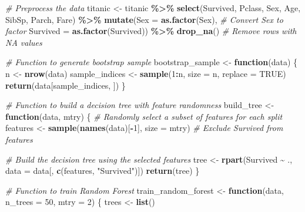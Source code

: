 \documentclass[
]{article}
\newenvironment{Shaded}{\begin{snugshade}}{\end{snugshade}}
\newcommand{\AttributeTok}[1]{\textcolor[rgb]{0.13,0.29,0.53}{#1}}
\newcommand{\CommentTok}[1]{\textcolor[rgb]{0.56,0.35,0.01}{\textit{#1}}}
\newcommand{\ConstantTok}[1]{\textcolor[rgb]{0.56,0.35,0.01}{#1}}
\newcommand{\ControlFlowTok}[1]{\textcolor[rgb]{0.13,0.29,0.53}{\textbf{#1}}}
\newcommand{\DecValTok}[1]{\textcolor[rgb]{0.00,0.00,0.81}{#1}}
\newcommand{\FunctionTok}[1]{\textcolor[rgb]{0.13,0.29,0.53}{\textbf{#1}}}
\newcommand{\NormalTok}[1]{#1}
\newcommand{\OtherTok}[1]{\textcolor[rgb]{0.56,0.35,0.01}{#1}}
\newcommand{\SpecialCharTok}[1]{\textcolor[rgb]{0.81,0.36,0.00}{\textbf{#1}}}
\newcommand{\StringTok}[1]{\textcolor[rgb]{0.31,0.60,0.02}{#1}}
\begin{document}
\begin{Shaded}
\begin{Highlighting}[]
\CommentTok{\# Preprocess the data}
\NormalTok{titanic }\OtherTok{\textless{}{-}}\NormalTok{ titanic }\SpecialCharTok{\%\textgreater{}\%}
  \FunctionTok{select}\NormalTok{(Survived, Pclass, Sex, Age, SibSp, Parch, Fare) }\SpecialCharTok{\%\textgreater{}\%}
  \FunctionTok{mutate}\NormalTok{(}\AttributeTok{Sex =} \FunctionTok{as.factor}\NormalTok{(Sex),  }\CommentTok{\# Convert Sex to factor}
         \AttributeTok{Survived =} \FunctionTok{as.factor}\NormalTok{(Survived)) }\SpecialCharTok{\%\textgreater{}\%}
  \FunctionTok{drop\_na}\NormalTok{()  }\CommentTok{\# Remove rows with NA values}

\CommentTok{\# Function to generate bootstrap sample}
\NormalTok{bootstrap\_sample }\OtherTok{\textless{}{-}} \ControlFlowTok{function}\NormalTok{(data) \{}
\NormalTok{  n }\OtherTok{\textless{}{-}} \FunctionTok{nrow}\NormalTok{(data)}
\NormalTok{  sample\_indices }\OtherTok{\textless{}{-}} \FunctionTok{sample}\NormalTok{(}\DecValTok{1}\SpecialCharTok{:}\NormalTok{n, }\AttributeTok{size =}\NormalTok{ n, }\AttributeTok{replace =} \ConstantTok{TRUE}\NormalTok{)}
  \FunctionTok{return}\NormalTok{(data[sample\_indices, ])}
\NormalTok{\}}

\CommentTok{\# Function to build a decision tree with feature randomness}
\NormalTok{build\_tree }\OtherTok{\textless{}{-}} \ControlFlowTok{function}\NormalTok{(data, mtry) \{}
  \CommentTok{\# Randomly select a subset of features for each split}
\NormalTok{  features }\OtherTok{\textless{}{-}} \FunctionTok{sample}\NormalTok{(}\FunctionTok{names}\NormalTok{(data)[}\SpecialCharTok{{-}}\DecValTok{1}\NormalTok{], }\AttributeTok{size =}\NormalTok{ mtry)  }\CommentTok{\# Exclude Survived from features}
  
  \CommentTok{\# Build the decision tree using the selected features}
\NormalTok{  tree }\OtherTok{\textless{}{-}} \FunctionTok{rpart}\NormalTok{(Survived }\SpecialCharTok{\textasciitilde{}}\NormalTok{ ., }\AttributeTok{data =}\NormalTok{ data[, }\FunctionTok{c}\NormalTok{(features, }\StringTok{"Survived"}\NormalTok{)])}
  \FunctionTok{return}\NormalTok{(tree)}
\NormalTok{\}}

\CommentTok{\# Function to train Random Forest}
\NormalTok{train\_random\_forest }\OtherTok{\textless{}{-}} \ControlFlowTok{function}\NormalTok{(data, }\AttributeTok{n\_trees =} \DecValTok{50}\NormalTok{, }\AttributeTok{mtry =} \DecValTok{2}\NormalTok{) \{}
\NormalTok{  trees }\OtherTok{\textless{}{-}} \FunctionTok{list}\NormalTok{()}
  

\end{Highlighting}
\end{Shaded}
\end{document}
